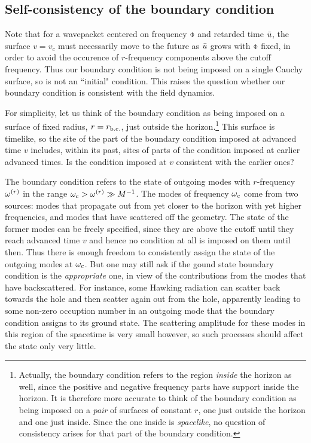 \subsection{Self-consistency of the boundary condition}

Note that for a wavepacket centered
on frequency $\obar$ and retarded time $\bar{u}$, the surface
$v=v_c$ must necessarily move to the future as $\bar{u}$ grows
with $\obar$ fixed, in order to avoid the occurence of
$r$-frequency components above the cutoff frequency. Thus
our boundary condition is not being imposed on a single Cauchy
surface, so is not an ``initial" condition. This raises the question
whether our boundary condition is consistent with the field dynamics.

For simplicity, let us think of the boundary condition as being
imposed on a surface of fixed radius, $r=r_{\rm b.c.}$, just outside
the horizon.\footnote{Actually, the boundary condition
refers to the region {\it inside} the horizon as well, since
the positive and negative frequency parts have support inside
the horizon. It is therefore more accurate to think of the
boundary condition as being imposed on a {\it pair} of
surfaces of constant $r$, one just outside the horizon and
one just inside. Since the one inside is {\it spacelike}, no
question of consistency arises for that part of the boundary
condition.}
This surface is timelike, so the site of
the part of the boundary condition imposed at advanced time $v$
includes, within its past, sites of parts of the condition imposed
at earlier advanced times. Is the condition imposed at $v$ consistent
with
the earlier ones?

The boundary condition refers to the
state of outgoing modes with $r$-frequency $\omega^{(r)}$ in the range
$\omega_c>\omega^{(r)}\gg M^{-1}$. The modes of frequency $\omega_c$ come from two
sources: modes that propagate out from yet closer to the horizon
with yet higher frequencies, and modes that have scattered off
the geometry.
The state of the former modes can be freely specified, since they are
above the cutoff until they reach advanced time $v$ and hence no
condition at all is imposed on them until then.
Thus there is enough freedom to consistently assign the
state of the outgoing modes at $\omega_c$. But one may still ask
if the gound state boundary condition is the {\it
appropriate} one, in view of the contributions from the
modes that have backscattered. For instance, some Hawking
radiation can scatter back towards the
hole and then scatter again out from the hole, apparently leading
to some non-zero occuption number in an outgoing mode that the
boundary condition assigns to its ground state. The scattering
amplitude for these modes in this region of the spacetime is very
small however, so such processes should affect the
state only very little.

